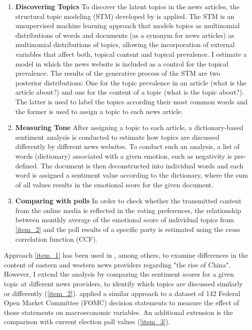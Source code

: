 \documentclass[12pt,a4paper,notitlepage]{article}
\begin{document}
\begin{enumerate}
	\item\label{item_1} \textbf{Discovering Topics} To discover the latent topics in the news articles, the structural topic modeling (STM) developed by \citet{roberts_model_2016} is applied. The STM is an unsupervised machine learning approach that models topics as multinomial distributions of words and documents (as a synonym for news articles) as multinomial distributions of topics, allowing the incorporation of external variables that affect both, topical content and topical prevalence. I estimate a model in which the news website is included as a control for the topical prevalence. The results of the generative process of the STM are two posterior distributions: One for the topic prevalence in an article (what is the article about?) and one for the content of a topic (what is the topic about?). The latter is used to label the topics according their most common words and the former is used to assign a topic to each news article. 
	\item\label{item_2} \textbf{Measuring Tone} After assigning a topic to each article, a dictionary-based sentiment analysis is conducted to estimate how topics are discussed differently by different news websites. To conduct such an analysis, a list of words (dictionary) associated with a given emotion, such as negativity is pre-defined. The document is then deconstructed into individual words and each word is assigned a sentiment value according to the dictionary, where the sum of all values results in the emotional score for the given document.   
	\item\label{item_3} \textbf{Comparing with polls} In order to check whether the transmitted content from the online media is reflected in the voting preferences, the relationship between monthly average of the emotional score of individual topics from \ref{item_2} and the poll results of a specific party is estimated using the cross correlation function (CCF).
\end{enumerate}

Approach \ref{item_1} has been used in \citet{roberts_model_2016}, among others, to examine differences in the content of eastern and western news providers regarding "the rise of China". However, I extend the analysis by comparing the sentiment scores for a given topic at different news providers, to identify which topics are discussed similarly or differently (\ref{item_2}). \citet{hansen_shocking_2016} applied a similar approach to a dataset of 142 Federal Open Market Committee (FOMC) decision statements to measure the effect of those statements on macroeconomic variables. An additional extension is the comparison with current election poll values (\ref{item_3}).
\end{document}

